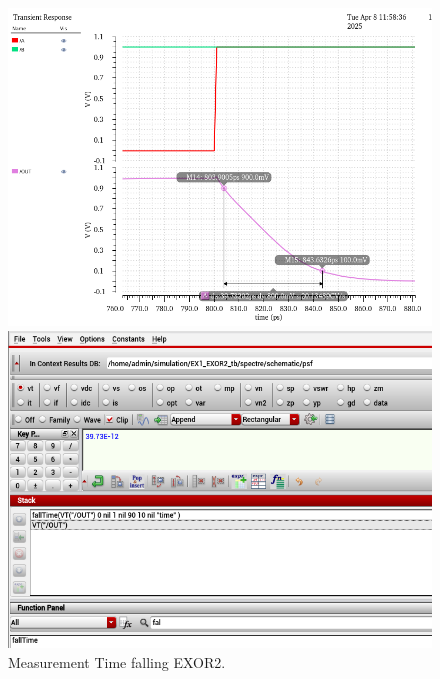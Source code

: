 \begin{figure}[H]
	\begin{minipage}{0.5\linewidth}
		\includegraphics[width=\linewidth]{section/EX1/EXOR/EX1_EXOR2_Tf_Waveform.png}
	\end{minipage}
	\begin{minipage}{0.5\linewidth}
		\includegraphics[width=\linewidth]{section/EX1/EXOR/EX1_EXOR2_Tf_Cal.png}
	\end{minipage}
	\caption{Measurement Time falling EXOR2.}
\end{figure}

